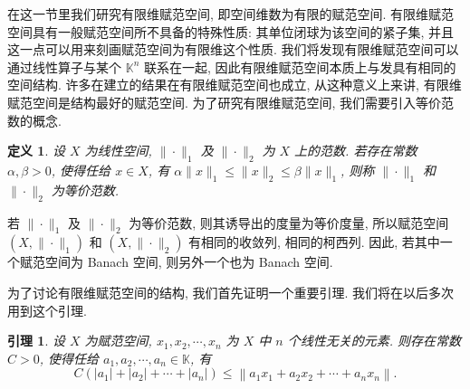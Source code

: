 \documentclass[openany]{ctexbook}
\theoremstyle{kaiti}
\newtheorem{definition}{定义}[section]
\newtheorem{lemma}{引理}[section]
\theoremstyle{normal}
\begin{document}
在这一节里我们研究有限维赋范空间, 即空间维数为有限的赋范空间. 有限维赋范空间具有一般赋范空间所不具备的特殊性质: 其单位闭球为该空间的紧子集, 并且这一点可以用来刻画赋范空间为有限维这个性质. 我们将发现有限维赋范空间可以通过线性算子与某个 $\mathbb{K}^n$ 联系在一起, 因此有限维赋范空间本质上与发具有相同的空间结构. 许多在建立的结果在有限维赋范空间也成立, 从这种意义上来讲, 有限维赋范空间是结构最好的赋范空间. 为了研究有限维赋范空间, 我们需要引入等价范数的概念.

\begin{definition}
设 $X$ 为线性空间, $\|\cdot\|_1$ 及 $\|\cdot\|_2$ 为 $X$ 上的范数. 若存在常数 $\alpha, \beta>0$, 使得任给 $x \in X$, 有
$\alpha\|x\|_1 \leqslant\|x\|_2 \leqslant \beta\|x\|_1$,
则称 $\|\cdot\|_1$ 和 $\|\cdot\|_2$ 为等价范数.
\end{definition}

若 $\|\cdot\|_1$ 及 $\|\cdot\|_2$ 为等价范数, 则其诱导出的度量为等价度量, 所以赋范空间 $\left(X,\|\cdot\|_1\right)$ 和 $\left(X,\|\cdot\|_2\right)$ 有相同的收敛列, 相同的柯西列. 因此, 若其中一个赋范空间为 Banach 空间, 则另外一个也为 Banach 空间.

为了讨论有限维赋范空间的结构, 我们首先证明一个重要引理. 我们将在以后多次用到这个引理.

\begin{lemma}
设 $X$ 为赋范空间, $x_1, x_2, \cdots, x_n$ 为 $X$ 中 $n$ 个线性无关的元素. 则存在常数 $C>0$, 使得任给 $a_1, a_2, \cdots, a_n \in \mathbb{K}$, 有
$$
C\left(\left|a_1\right|+\left|a_2\right|+\cdots+\left|a_n\right|\right) \leqslant\left\|a_1 x_1+a_2 x_2+\cdots+a_n x_n\right\|.
$$
\end{lemma}
\end{document}
